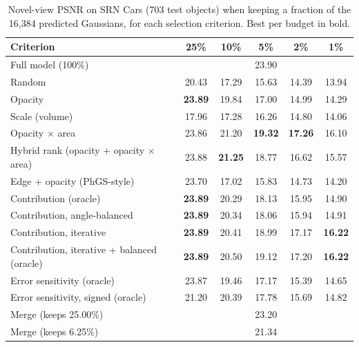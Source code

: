 \begin{table}[t]
\centering
\small
\begin{tabular}{lccccc}
\toprule
Criterion & 25\% & 10\% & 5\% & 2\% & 1\% \\
\midrule
Full model (100\%) & \multicolumn{5}{c}{23.90} \\
\midrule
Random & 20.43 & 17.29 & 15.63 & 14.39 & 13.94 \\
Opacity & \textbf{23.89} & 19.84 & 17.00 & 14.99 & 14.29 \\
Scale (volume) & 17.96 & 17.28 & 16.26 & 14.80 & 14.06 \\
Opacity $\times$ area & 23.86 & 21.20 & \textbf{19.32} & \textbf{17.26} & 16.10 \\
Hybrid rank (opacity + opacity $\times$ area) & 23.88 & \textbf{21.25} & 18.77 & 16.62 & 15.57 \\
Edge + opacity (PhGS-style) & 23.70 & 17.02 & 15.83 & 14.73 & 14.20 \\
Contribution (oracle) & \textbf{23.89} & 20.29 & 18.13 & 15.95 & 14.90 \\
Contribution, angle-balanced & \textbf{23.89} & 20.34 & 18.06 & 15.94 & 14.91 \\
Contribution, iterative & \textbf{23.89} & 20.41 & 18.99 & 17.17 & \textbf{16.22} \\
Contribution, iterative + balanced (oracle) & \textbf{23.89} & 20.50 & 19.12 & 17.20 & \textbf{16.22} \\
Error sensitivity (oracle) & 23.87 & 19.46 & 17.17 & 15.39 & 14.65 \\
Error sensitivity, signed (oracle) & 21.20 & 20.39 & 17.78 & 15.69 & 14.82 \\
\midrule
Merge (keeps 25.00\%) & \multicolumn{5}{c}{23.20} \\
Merge (keeps 6.25\%) & \multicolumn{5}{c}{21.34} \\
\bottomrule
\end{tabular}
\caption{Novel-view PSNR on SRN Cars (703 test objects) when keeping a fraction of the 16{,}384 predicted Gaussians, for each selection criterion. Best per budget in bold.}
\label{tab:level1}
\end{table}

